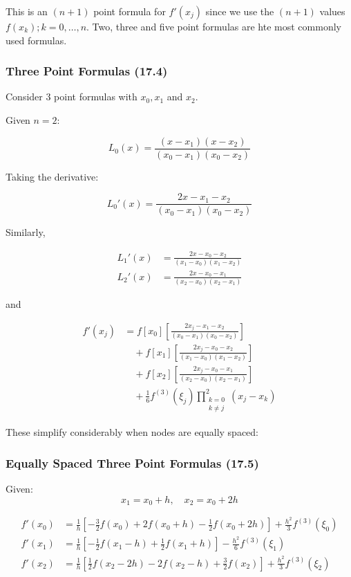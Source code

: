 \documentclass[12pt]{article}
\begin{document}
This is an $(n+1)$ point formula for $f'(x_j)$ since we use the $(n+1)$ values
$f(x_k); k=0,\dots,n$. Two, three and five point formulas are hte most commonly
used formulas.

\subsubsection{Three Point Formulas (17.4)}

Consider $3$ point formulas with $x_0, x_1$ and $x_2$.

Given \( n = 2 \):

\[
L_0(x) = \frac{(x - x_1)(x - x_2)}{(x_0 - x_1)(x_0 - x_2)}
\]

Taking the derivative:

\[
L_0'(x) = \frac{2x - x_1 - x_2}{(x_0 - x_1)(x_0 - x_2)}
\]

Similarly,

\begin{align*}
    L_1'(x) &= \frac{2x - x_0 - x_2}{(x_1 - x_0)(x_1 - x_2)} \\[10pt]
    L_2'(x) &= \frac{2x - x_0 - x_1}{(x_2 - x_0)(x_2 - x_1)}
\end{align*}

\noindent and

\begin{align*}
    f'(x_j) &= f[x_0] \left[ \frac{2x_j - x_1 - x_2}{(x_0 - x_1)(x_0 - x_2)} \right] \\[10pt]
    &\quad + f[x_1] \left[ \frac{2x_j - x_0 - x_2}{(x_1 - x_0)(x_1 - x_2)} \right] \\[10pt]
    &\quad + f[x_2] \left[ \frac{2x_j - x_0 - x_1}{(x_2 - x_0)(x_2 - x_1)} \right] \\[10pt]
    &\quad + \frac{1}{6} f^{(3)}(\xi_j) \prod_{\substack{k=0 \\ k \neq j}}^{2} (x_j - x_k)
\end{align*}

These simplify considerably when nodes are equally spaced:

\subsubsection{Equally Spaced Three Point Formulas (17.5)}\label{sec:equally_spaced_three_point_formulas}

Given:
\[
x_1 = x_0 + h, \quad x_2 = x_0 + 2h
\]

\begin{align}
    f'(x_0) &= \frac{1}{h} \left[ -\frac{3}{2} f(x_0) + 2f(x_0 + h) - \frac{1}{2} f(x_0 + 2h) \right] 
    + \frac{h^2}{3} f^{(3)}(\xi_0)
    \label{eq:three_point_formula_1}\\[10pt] 
    f'(x_1) &= \frac{1}{h} \left[ -\frac{1}{2} f(x_1 - h) + \frac{1}{2} f(x_1 + h) \right] 
    - \frac{h^2}{6} f^{(3)}(\xi_1) 
    \label{eq:three_point_formula_2}\\[10pt]
    f'(x_2) &= \frac{1}{h} \left[ \frac{1}{2} f(x_2 - 2h) - 2f(x_2 - h) + \frac{3}{2} f(x_2) \right] 
    + \frac{h^2}{3} f^{(3)}(\xi_2)
    \label{eq:three_point_formula_3}
\end{align}
\end{document}
